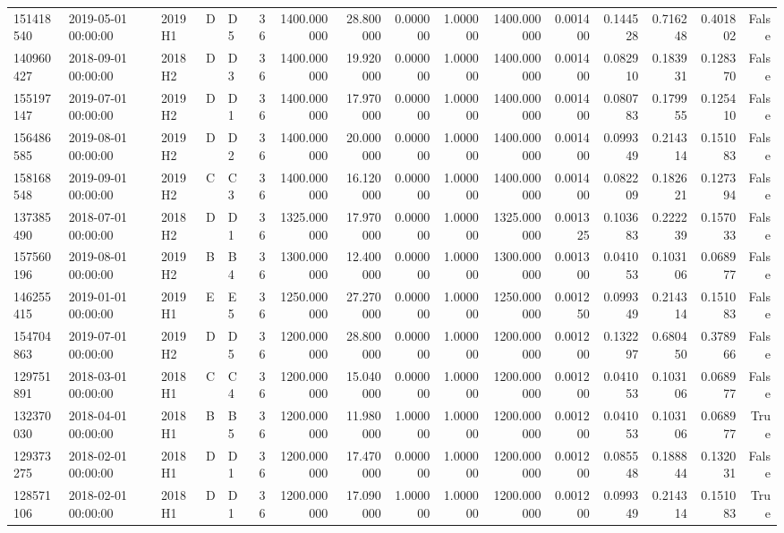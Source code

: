 \begin{tabular}{lllllrrrrrrrrrrr}
151418540 & 2019-05-01 00:00:00 & 2019H1 & D & D5 & 36 & 1400.000000 & 28.800000 & 0.000000 & 1.000000 & 1400.000000 & 0.001400 & 0.144528 & 0.716248 & 0.401802 & False \\
140960427 & 2018-09-01 00:00:00 & 2018H2 & D & D3 & 36 & 1400.000000 & 19.920000 & 0.000000 & 1.000000 & 1400.000000 & 0.001400 & 0.082910 & 0.183931 & 0.128370 & False \\
155197147 & 2019-07-01 00:00:00 & 2019H2 & D & D1 & 36 & 1400.000000 & 17.970000 & 0.000000 & 1.000000 & 1400.000000 & 0.001400 & 0.080783 & 0.179955 & 0.125410 & False \\
156486585 & 2019-08-01 00:00:00 & 2019H2 & D & D2 & 36 & 1400.000000 & 20.000000 & 0.000000 & 1.000000 & 1400.000000 & 0.001400 & 0.099349 & 0.214314 & 0.151083 & False \\
158168548 & 2019-09-01 00:00:00 & 2019H2 & C & C3 & 36 & 1400.000000 & 16.120000 & 0.000000 & 1.000000 & 1400.000000 & 0.001400 & 0.082209 & 0.182621 & 0.127394 & False \\
137385490 & 2018-07-01 00:00:00 & 2018H2 & D & D1 & 36 & 1325.000000 & 17.970000 & 0.000000 & 1.000000 & 1325.000000 & 0.001325 & 0.103683 & 0.222239 & 0.157033 & False \\
157560196 & 2019-08-01 00:00:00 & 2019H2 & B & B4 & 36 & 1300.000000 & 12.400000 & 0.000000 & 1.000000 & 1300.000000 & 0.001300 & 0.041053 & 0.103106 & 0.068977 & False \\
146255415 & 2019-01-01 00:00:00 & 2019H1 & E & E5 & 36 & 1250.000000 & 27.270000 & 0.000000 & 1.000000 & 1250.000000 & 0.001250 & 0.099349 & 0.214314 & 0.151083 & False \\
154704863 & 2019-07-01 00:00:00 & 2019H2 & D & D5 & 36 & 1200.000000 & 28.800000 & 0.000000 & 1.000000 & 1200.000000 & 0.001200 & 0.132297 & 0.680450 & 0.378966 & False \\
129751891 & 2018-03-01 00:00:00 & 2018H1 & C & C4 & 36 & 1200.000000 & 15.040000 & 0.000000 & 1.000000 & 1200.000000 & 0.001200 & 0.041053 & 0.103106 & 0.068977 & False \\
132370030 & 2018-04-01 00:00:00 & 2018H1 & B & B5 & 36 & 1200.000000 & 11.980000 & 1.000000 & 1.000000 & 1200.000000 & 0.001200 & 0.041053 & 0.103106 & 0.068977 & True \\
129373275 & 2018-02-01 00:00:00 & 2018H1 & D & D1 & 36 & 1200.000000 & 17.470000 & 0.000000 & 1.000000 & 1200.000000 & 0.001200 & 0.085548 & 0.188844 & 0.132031 & False \\
128571106 & 2018-02-01 00:00:00 & 2018H1 & D & D1 & 36 & 1200.000000 & 17.090000 & 1.000000 & 1.000000 & 1200.000000 & 0.001200 & 0.099349 & 0.214314 & 0.151083 & True \\

\end{tabular}

